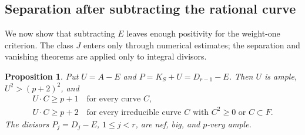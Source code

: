 \documentclass[11pt,reqno]{amsart}
\numberwithin{equation}{section}
\newtheorem{proposition}[proposition]{Proposition}
\theoremstyle{remark}
\begin{document}
\subsection{Separation after subtracting the rational curve}\label{sec:fixed-separation}

We now show that subtracting \(E\) leaves enough positivity for the weight-one criterion. The class \(J\) enters only through numerical estimates; the separation and vanishing theorems are applied only to integral divisors.

\begin{proposition}
\label{prop:fixed-predecessors}
Put \(U=A-E\) and \(P=K_S+U=D_{r-1}-E\). Then \(U\) is ample, \(U^2>(p+2)^2\), and
\begin{equation}\label{eq:fixed-U-bounds}
 \begin{gathered}
 U\cdot C\geq p+1\quad\text{for every curve }C,\\
 U\cdot C\geq p+2\quad\text{for every irreducible curve \(C\) with \(C^2\geq0\) or \(C\subset F\).}
 \end{gathered}
\end{equation}
The divisors \(P_j=D_j-E\), \(1\leq j<r\), are nef, big, and \(p\)-very ample.
\end{proposition}
\end{document}
